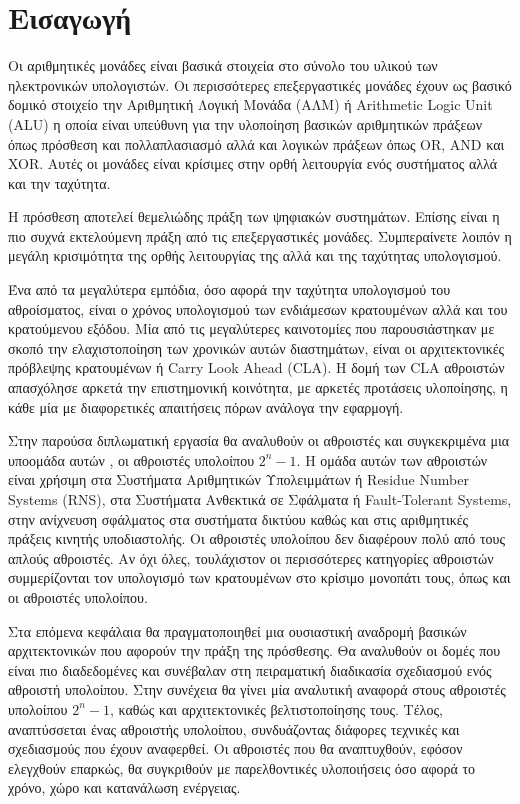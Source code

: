 
\section{Εισαγωγή}

Οι αριθμητικές μονάδες είναι βασικά στοιχεία στο σύνολο του υλικού των ηλεκτρονικών υπολογιστών. Οι περισσότερες επεξεργαστικές μονάδες έχουν ως βασικό δομικό στοιχείο την Αριθμητική Λογική Μονάδα (ΑΛΜ) ή Arithmetic Logic Unit (ALU) η οποία είναι υπεύθυνη για την υλοποίηση βασικών αριθμητικών πράξεων όπως πρόσθεση και πολλαπλασιασμό αλλά και λογικών πράξεων όπως OR, AND και XOR. Αυτές οι μονάδες είναι κρίσιμες στην ορθή λειτουργία ενός συστήματος αλλά και την ταχύτητα.

Η πρόσθεση αποτελεί θεμελιώδης πράξη των ψηφιακών συστημάτων. Επίσης είναι η πιο συχνά εκτελούμενη πράξη από τις επεξεργαστικές μονάδες. Συμπεραίνετε λοιπόν η μεγάλη κρισιμότητα της ορθής λειτουργίας της αλλά και της ταχύτητας υπολογισμού. 

Ένα από τα μεγαλύτερα εμπόδια, όσο αφορά την ταχύτητα υπολογισμού του αθροίσματος, είναι ο χρόνος υπολογισμού των ενδιάμεσων κρατουμένων αλλά και του κρατούμενου εξόδου. Μία από τις μεγαλύτερες καινοτομίες που παρουσιάστηκαν με σκοπό την ελαχιστοποίηση των χρονικών αυτών διαστημάτων, είναι οι αρχιτεκτονικές πρόβλεψης κρατουμένων ή Carry Look Ahead (CLA). Η δομή των CLA αθροιστών απασχόλησε αρκετά την επιστημονική κοινότητα, με αρκετές προτάσεις υλοποίησης, η κάθε μία με διαφορετικές απαιτήσεις πόρων ανάλογα την εφαρμογή.


Στην παρούσα διπλωματική εργασία θα αναλυθούν οι αθροιστές και συγκεκριμένα μια υποομάδα αυτών , οι αθροιστές υπολοίπου $2^n-1$. Η ομάδα αυτών των αθροιστών είναι χρήσιμη στα Συστήματα Αριθμητικών Υπολειμμάτων ή Residue Number Systems (RNS), στα Συστήματα Ανθεκτικά σε Σφάλματα ή Fault-Tolerant Systems, στην ανίχνευση σφάλματος στα συστήματα δικτύου καθώς και στις αριθμητικές πράξεις κινητής υποδιαστολής. Οι αθροιστές υπολοίπου δεν διαφέρουν πολύ από τους απλούς αθροιστές. Αν όχι όλες, τουλάχιστον οι περισσότερες κατηγορίες αθροιστών συμμερίζονται τον υπολογισμό των κρατουμένων στο κρίσιμο μονοπάτι τους, όπως και οι αθροιστές υπολοίπου.

Στα επόμενα κεφάλαια θα πραγματοποιηθεί μια ουσιαστική αναδρομή βασικών αρχιτεκτονικών 
που αφορούν την πράξη της πρόσθεσης. Θα αναλυθούν οι δομές που είναι πιο διαδεδομένες και
συνέβαλαν στη πειραματική διαδικασία σχεδιασμού ενός αθροιστή υπολοίπου. Στην συνέχεια 
θα γίνει μία αναλυτική αναφορά στους αθροιστές υπολοίπου $2^n-1$, καθώς και αρχιτεκτονικές
βελτιστοποίησης τους. Τέλος, αναπτύσσεται ένας αθροιστής υπολοίπου, συνδυάζοντας διάφορες 
τεχνικές και σχεδιασμούς που έχουν αναφερθεί. Οι αθροιστές που θα αναπτυχθούν, εφόσον ελεγχθούν επαρκώς, θα συγκριθούν με παρελθοντικές υλοποιήσεις όσο αφορά το χρόνο, χώρο και κατανάλωση ενέργειας.

